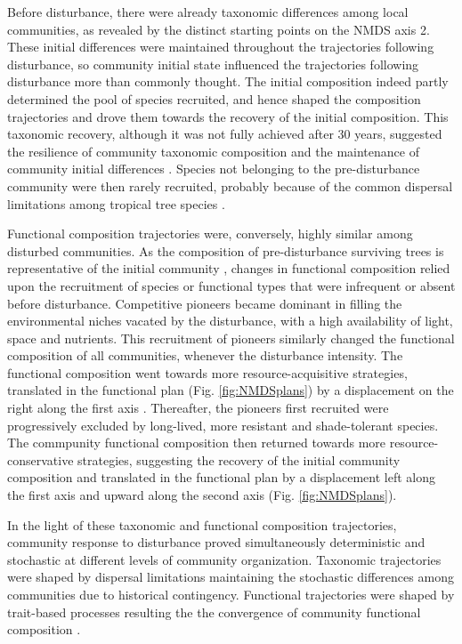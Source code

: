\documentclass[fleqn,10pt]{ArtEcoFoG} %
\begin{document}
Before disturbance, there were already taxonomic differences among local
communities, as revealed by the distinct starting points on the NMDS
axis 2. These initial differences were maintained throughout the
trajectories following disturbance, so community initial state
influenced the trajectories following disturbance more than commonly
thought. The initial composition indeed partly determined the pool of
species recruited, and hence shaped the composition trajectories and
drove them towards the recovery of the initial composition. This
taxonomic recovery, although it was not fully achieved after 30 years,
suggested the resilience of community taxonomic composition and the
maintenance of community initial differences \citep{Folke2006}. Species
not belonging to the pre-disturbance community were then rarely
recruited, probably because of the common dispersal limitations among
tropical tree species \citep{Svenning2005}.

Functional composition trajectories were, conversely, highly similar
among disturbed communities. As the composition of pre-disturbance
surviving trees is representative of the initial community
\citep{Herault2018}, changes in functional composition relied upon the
recruitment of species or functional types that were infrequent or
absent before disturbance. Competitive pioneers became dominant in
filling the environmental niches vacated by the disturbance, with a high
availability of light, space and nutrients. This recruitment of pioneers
similarly changed the functional composition of all communities,
whenever the disturbance intensity. The functional composition went
towards more resource-acquisitive strategies, translated in the
functional plan (Fig. \ref{fig:NMDSplans}) by a displacement on the
right along the first axis \citep{Westoby1998, Wright2004, Reich2014}.
Thereafter, the pioneers first recruited were progressively excluded by
long-lived, more resistant and shade-tolerant species. The commpunity
functional composition then returned towards more resource-conservative
strategies, suggesting the recovery of the initial community composition
and translated in the functional plan by a displacement left along the
first axis and upward along the second axis (Fig. \ref{fig:NMDSplans}).

In the light of these taxonomic and functional composition trajectories,
community response to disturbance proved simultaneously deterministic
and stochastic at different levels of community organization. Taxonomic
trajectories were shaped by dispersal limitations maintaining the
stochastic differences among communities due to historical contingency.
Functional trajectories were shaped by trait-based processes resulting
the the convergence of community functional composition
\citep{Fukami2005}.
\end{document}
